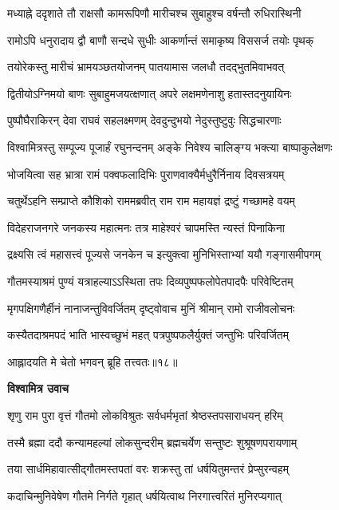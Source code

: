 \twolineshloka
{मध्याह्ने ददृशाते तौ राक्षसौ कामरूपिणौ}
{मारीचश्च सुबाहुश्च वर्षन्तौ रुधिरास्थिनी} %

\twolineshloka
{रामोऽपि धनुरादाय द्वौ बाणौ सन्दधे सुधीः}
{आकर्णान्तं समाकृष्य विससर्ज तयोः पृथक्} %

\twolineshloka
{तयोरेकस्तु मारीचं भ्रामयञ्छतयोजनम्}
{पातयामास जलधौ तदद्भुतमिवाभवत्} %

\twolineshloka
{द्वितीयोऽग्निमयो बाणः सुबाहुमजयत्क्षणात्}
{अपरे लक्षमणेनाशु हतास्तदनुयायिनः} %

\twolineshloka
{पुष्पौघैराकिरन् देवा राघवं सहलक्ष्मणम्}
{देवदुन्दुभयो नेदुस्तुष्टुवुः सिद्धचारणाः} %

\twolineshloka
{विश्वामित्रस्तु सम्पूज्य पूजार्हं रघुनन्दनम्}
{अङ्के निवेश्य चालिङ्ग्य भक्त्या बाष्पाकुलेक्षणः} %

\twolineshloka
{भोजयित्वा सह भ्रात्रा रामं पक्वफलादिभिः}
{पुराणवाक्यैर्मधुरैर्निनाय दिवसत्रयम्} %

\twolineshloka
{चतुर्थेऽहनि सम्प्राप्ते कौशिको राममब्रवीत्}
{राम राम महायज्ञं द्रष्टुं गच्छामहे वयम्} %

\twolineshloka
{विदेहराजनगरे जनकस्य महात्मनः}
{तत्र माहेश्वरं चापमस्ति न्यस्तं पिनाकिना} %

\twolineshloka
{द्रक्ष्यसि त्वं महासत्त्वं पूज्यसे जनकेन च}
{इत्युक्त्वा मुनिभिस्ताभ्यां ययौ गङ्गासमीपगम्} %

\twolineshloka
{गौतमस्याश्रमं पुण्यं यत्राहल्याऽऽस्थिता तपः}
{दिव्यपुष्पफलोपेतपादपैः परिवेष्टितम्} %

\twolineshloka
{मृगपक्षिगणैर्हीनं नानाजन्तुविवर्जितम्}
{दृष्ट्वोवाच मुनिं श्रीमान् रामो राजीवलोचनः} %

\twolineshloka
{कस्यैतदाश्रमपदं भाति भास्वच्छुभं महत्}
{पत्रपुष्पफलैर्युक्तं जन्तुभिः परिवर्जितम्} %

{आह्लादयति मे चेतो भगवन् ब्रूहि तत्त्वतः॥१८॥} %


\textbf{विश्वामित्र उवाच}

\twolineshloka
{शृणु राम पुरा वृत्तं गौतमो लोकविश्रुतः}
{सर्वधर्मभृतां श्रेष्ठस्तपसाराधयन् हरिम्} %

\twolineshloka
{तस्मै ब्रह्मा ददौ कन्यामहल्यां लोकसुन्दरीम्}
{ब्रह्मचर्येण सन्तुष्टः शुश्रूषणपरायणाम्} %

\twolineshloka
{तया सार्धमिहावात्सीद्गौतमस्तपतां वरः}
{शक्रस्तु तां धर्षयितुमन्तरं प्रेप्सुरन्वहम्} %

\twolineshloka
{कदाचिन्मुनिवेषेण गौतमे निर्गते गृहात्}
{धर्षयित्वाथ निरगात्त्वरितं मुनिरप्यगात्} %

